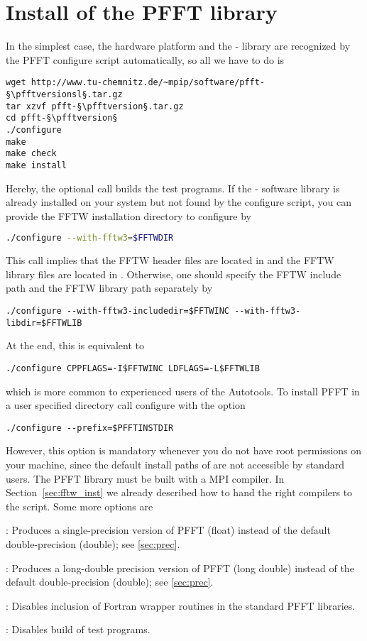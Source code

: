 \section{Install of the PFFT library}\label{sec:pfft-inst}
In the simplest case, the hardware platform and the \fftw-\fftwversion{} library are
recognized by the PFFT configure script automatically, so all we have to do is
\begin{lstlisting}[escapechar=§]
wget http://www.tu-chemnitz.de/~mpip/software/pfft-§\pfftversionsl§.tar.gz
tar xzvf pfft-§\pfftversion§.tar.gz
cd pfft-§\pfftversion§
./configure
make
make check
make install
\end{lstlisting}
Hereby, the optional call  builds the test programs.
If the \fftw-\fftwversion{} software library is already installed on your system but not found by the configure script,
you can provide the FFTW installation directory  to configure by
\begin{lstlisting}[language=bash]
./configure --with-fftw3=$FFTWDIR
\end{lstlisting}
This call implies that the FFTW header files are located in  and the FFTW library files are located
in . Otherwise, one should specify the FFTW include path  and the FFTW library path
 separately by
\begin{lstlisting}[prebreak = {\textbackslash}]
./configure --with-fftw3-includedir=$FFTWINC --with-fftw3-libdir=$FFTWLIB
\end{lstlisting}
At the end, this is equivalent to
\begin{lstlisting}[prebreak = {\textbackslash}]
./configure CPPFLAGS=-I$FFTWINC LDFLAGS=-L$FFTWLIB
\end{lstlisting}
which is more common to experienced users of the Autotools.
To install PFFT in a user specified directory  call configure with the option
\begin{lstlisting}
./configure --prefix=$PFFTINSTDIR
\end{lstlisting}
However, this option is mandatory whenever you do not have root permissions on your machine, since the default install paths of 
 are not accessible by standard users.
The PFFT library must be built with a MPI compiler. In Section~\ref{sec:fftw_inst} we already described how to hand the right compilers to the  script.
Some more options are
\begin{compactitem}
  \item {}: Produces a single-precision version of PFFT (float) instead of the default double-precision (double); see \ref{sec:prec}.
  \item {}: Produces a long-double precision version of PFFT (long double) instead of the default double-precision (double); see \ref{sec:prec}.
  \item {}: Disables inclusion of Fortran wrapper routines in the standard PFFT libraries.
  \item {}: Disables build of test programs.
\end{compactitem}
